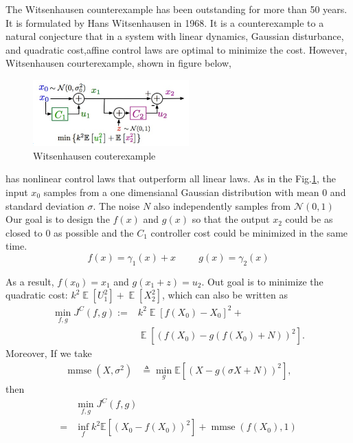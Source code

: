 \documentclass[conference,compsoc]{IEEEtran}
\DeclareMathOperator{\E}{\mathbb{E}}
\begin{document}
The Witsenhausen counterexample has been outstanding for more than 50 years. It is formulated by Hans Witsenhausen in 1968\cite{witsenhausen1968counterexample}. It is a counterexample to a natural conjecture that in a system with linear dynamics, Gaussian disturbance, and quadratic cost,affine control laws are optimal to minimize the cost. However, Witsenhausen courterexample, shown in figure below,
\begin{figure}[htp]
    \centering
    \includegraphics[width=6cm]{images/Wits_definition.png}
    \caption{Witsenhausen couterexample}
    \label{fig:definition}
\end{figure}
has nonlinear control laws that outperform all linear laws. As in the Fig.\ref{fig:definition}, the input $x_0$ samples from a one dimensianal Gaussian distribution with mean 0 and standard deviation $\sigma$. The noise $N$ also independently samples from $\mathcal{N}(0,1) $ Our goal is to design the $f(x)$ and $g(x)$ so that the output $x_2$ could be as closed to 0 as possible and the $C_1$ controller cost could be minimized in the same time.
\begin{equation}
    f(x)=\gamma_1(x)+x \hspace{1cm} g(x)=\gamma_2(x)
\end{equation}

As a result, $f(x_0)=x_1$ and $g(x_1+z)=u_2$. Out goal is to minimize the quadratic cost: $k^{2} \E [U_1^{2}]+\E[X_2^{2}]$, which can also be written as 
\begin{equation}\label{eq:minJ}
\begin{aligned}
\min_{f,g}J^{C}(f,g):=&k^{2}\E[f(X_0)-X_0]^{2}+\\
&\E[(f(X_0)-g(f(X_0)+N))^{2}].
\end{aligned}
\end{equation}
Moreover, If we take
\begin{equation}
\begin{aligned}
  \operatorname{mmse}\left(X, \sigma^{2}\right) & \triangleq \min _{g} \mathbb{E}\left[(X-g(\sigma X+N))^{2}\right],
  \end{aligned}
\end{equation}
then
\begin{equation}\label{eq:minJ_more}
  \begin{aligned}
  &\min_{f,g}J^{C}(f,g)\\
  =&\inf _{f} k^{2} \mathbb{E}\left[\left(X_{0}-f\left(X_{0}\right)\right)^{2}\right]+\operatorname{mmse}\left(f\left(X_{0}\right), 1\right)
  \end{aligned}
  \end{equation}
\end{document}
